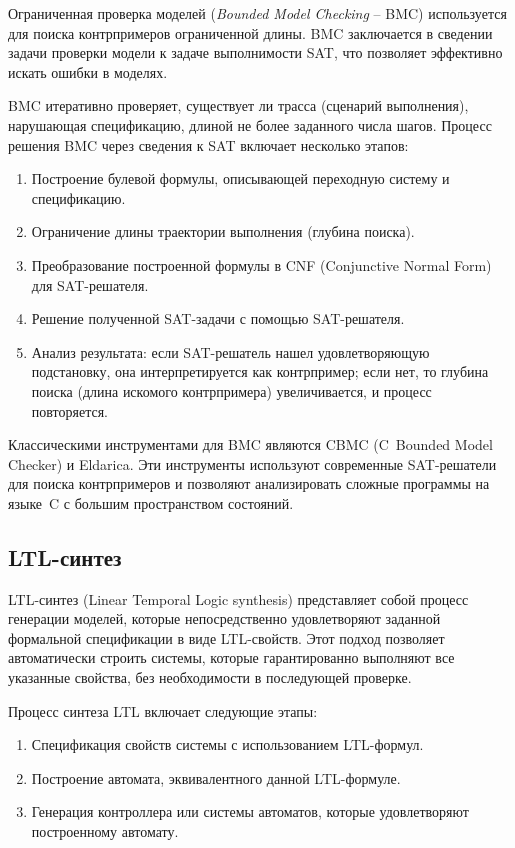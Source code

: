 Ограниченная проверка моделей (\textit{Bounded Model Checking} \--- BMC) используется для поиска контрпримеров ограниченной длины.
BMC заключается в сведении задачи проверки модели к задаче выполнимости SAT, что позволяет эффективно искать ошибки в моделях.

BMC итеративно проверяет, существует ли трасса (сценарий выполнения), нарушающая спецификацию, длиной не более заданного числа шагов.
Процесс решения BMC через сведения к SAT включает несколько этапов:
\begin{enumerate}
    \item Построение булевой формулы, описывающей переходную систему и спецификацию.
    \item Ограничение длины траектории выполнения (глубина поиска).
    \item Преобразование построенной формулы в CNF (Conjunctive Normal Form) для SAT-решателя.
    \item Решение полученной SAT-задачи с помощью SAT-решателя.
    \item Анализ результата: если SAT-решатель нашел удовлетворяющую подстановку, она интерпретируется как контрпример; если нет, то глубина поиска (длина искомого контрпримера) увеличивается, и процесс повторяется.
\end{enumerate}

Классическими инструментами для BMC являются CBMC (C~Bounded Model Checker) и Eldarica.
Эти инструменты используют современные SAT-решатели для поиска контрпримеров и позволяют анализировать сложные программы на языке~C с большим пространством состояний.


\subsection{LTL-синтез}

LTL-синтез (Linear Temporal Logic synthesis) представляет собой процесс генерации моделей, которые непосредственно удовлетворяют заданной формальной спецификации в виде LTL-свойств.
Этот подход позволяет автоматически строить системы, которые гарантированно выполняют все указанные свойства, без необходимости в последующей проверке.

Процесс синтеза LTL включает следующие этапы:
\begin{enumerate}
    \item Спецификация свойств системы с использованием LTL-формул.
    \item Построение автомата, эквивалентного данной LTL-формуле.
    \item Генерация контроллера или системы автоматов, которые удовлетворяют построенному автомату.
\end{enumerate}

